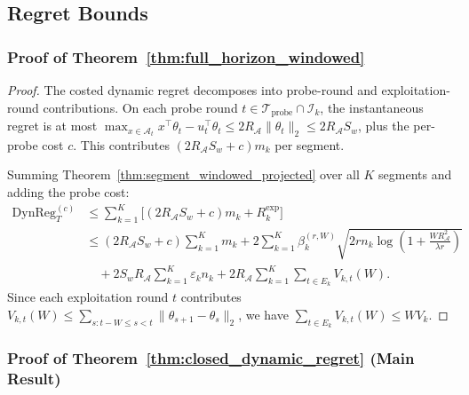 \documentclass{article}
\newcommand{\cA}{\mathcal{A}}
\newcommand{\cI}{\mathcal{I}}
\newcommand{\cTprobe}{\mathcal{T}_{\mathrm{probe}}}
\newcommand{\DynReg}{\mathrm{DynReg}}
\begin{document}
\subsection{Regret Bounds}

\subsubsection{Proof of Theorem~\ref{thm:full_horizon_windowed}}
\label{proof:full_horizon_windowed}

\begin{proof}
The costed dynamic regret decomposes into probe-round and exploitation-round contributions.
On each probe round $t \in \cTprobe \cap \cI_k$, the instantaneous regret is at most $\max_{x \in \cA_t} x^\top \theta_t - u_t^\top \theta_t \le 2R_{\cA} \|\theta_t\|_2 \le 2R_{\cA} S_w$, plus the per-probe cost $c$.
This contributes $(2R_{\cA} S_w + c) m_k$ per segment.

Summing Theorem~\ref{thm:segment_windowed_projected} over all $K$ segments and adding the probe cost:
\[
\begin{aligned}
\DynReg_T^{(c)} &\le \sum_{k=1}^K \bigl[(2R_{\cA}S_w+c)m_k + R_k^{\mathrm{exp}}\bigr] \\
&\le (2R_{\cA}S_w+c)\sum_{k=1}^K m_k + 2\sum_{k=1}^K \beta_k^{(r,W)} \sqrt{2r n_k \log\!\left(1+\frac{W R_{\cA}^2}{\lambda r}\right)} \\
&\quad + 2S_wR_{\cA} \sum_{k=1}^K \varepsilon_k n_k + 2R_{\cA} \sum_{k=1}^K \sum_{t \in E_k} V_{k,t}(W).
\end{aligned}
\]
Since each exploitation round $t$ contributes $V_{k,t}(W) \le \sum_{s: t-W \le s < t} \|\theta_{s+1} - \theta_s\|_2$, we have $\sum_{t \in E_k} V_{k,t}(W) \le W V_k$.
\end{proof}

\subsubsection{Proof of Theorem~\ref{thm:closed_dynamic_regret} (Main Result)}
\label{proof:closed_dynamic_regret}
\end{document}
